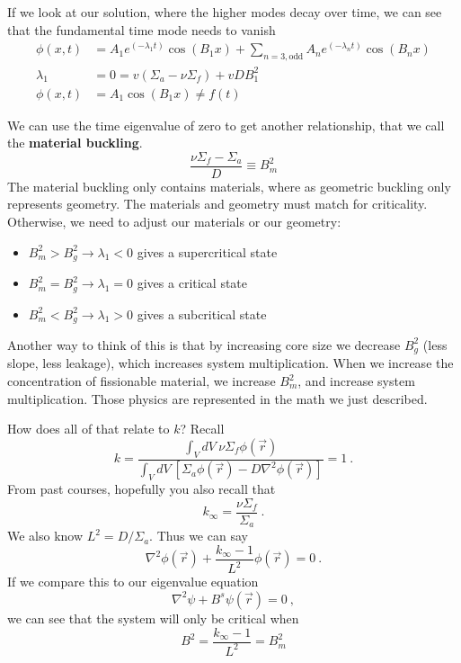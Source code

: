 \documentclass[12pt]{article}
\begin{document}
If we look at our solution, where the higher modes decay over time, we can see that the fundamental time mode needs to vanish
\begin{align*}
\phi(x,t) &= A_1 e^{(-\lambda_1 t)}\cos(B_1 x) + \sum_{n=3,\text{odd}} A_n e^{(-\lambda_n t)} \cos(B_nx)\\
%
\lambda_1 &= 0 = v(\Sigma_a - \nu \Sigma_f) + v D B_1^2\\
%
\phi(x,t) &= A_1 \cos(B_1 x) \neq f(t)
\end{align*}

We can use the time eigenvalue of zero to get another relationship, that we call the \textbf{material buckling}.
\[
\frac{\nu \Sigma_f - \Sigma_a}{D} \equiv B_m^2
\]
The material buckling only contains materials, where as geometric buckling only represents geometry. The materials and geometry must match for criticality. Otherwise, we need to adjust our materials or our geometry:
\begin{itemize}
\item $B_m^2 > B_g^2 \rightarrow \lambda_1 < 0$ gives a supercritical state
\item $B_m^2 = B_g^2 \rightarrow \lambda_1 = 0$ gives a critical state
\item $B_m^2 < B_g^2 \rightarrow \lambda_1 > 0$ gives a subcritical state
\end{itemize}
Another way to think of this is that by increasing core size we decrease $B_g^2$ (less slope, less leakage), which increases system multiplication. When we increase the concentration of fissionable material, we increase $B_m^2$, and increase system multiplication. Those physics are represented in the math we just described. 

How does all of that relate to $k$? Recall
\[
k = \frac{\int_V dV\: \nu \Sigma_f \phi(\vec{r})}{\int_V dV\: [\Sigma_a \phi(\vec{r}) - D \nabla^2 \phi(\vec{r})]} = 1 \:.
\]
From past courses, hopefully you also recall that
\[
k_{\infty} = \frac{\nu \Sigma_f}{\Sigma_a}\:.
\]
We also know $L^2 = D/\Sigma_a$. Thus we can say
\[
\nabla^2 \phi(\vec{r}) + \frac{k_{\infty} - 1}{L^2} \phi(\vec{r}) = 0\:.
\]
If we compare this to our eigenvalue equation
\[
\nabla^2 \psi + B^s \psi(\vec{r}) = 0\:,
\]
we can see that the system will only be critical when
\[
B^2 = \frac{k_{\infty} - 1}{L^2} = B_m^2
\]
\end{document}
